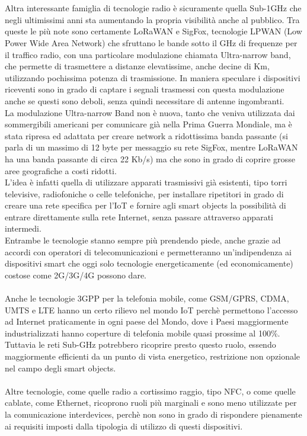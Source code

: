 \\\\Altra interessante famiglia di tecnologie radio è sicuramente quella Sub-1GHz che negli ultimissimi anni sta aumentando la propria visibilità anche al pubblico. Tra queste le più note sono certamente LoRaWAN e SigFox, tecnologie LPWAN (Low Power Wide Area Network) che sfruttano le bande sotto il GHz di frequenze per il traffico radio, con una particolare modulazione chiamata Ultra-narrow band, che permette di trasmettere a distanze elevatissime, anche decine di Km, utilizzando pochissima potenza di trasmissione. In maniera speculare i dispositivi riceventi sono in grado di captare i segnali trasmessi con questa modulazione anche se questi sono deboli, senza quindi necessitare di antenne ingombranti.
\\La modulazione Ultra-narrow Band non è nuova, tanto che veniva utilizzata dai sommergibili americani per comunicare già nella Prima Guerra Mondiale, ma è stata ripresa ed adattata per creare network a ridottissima banda passante (si parla di un massimo di 12 byte per messaggio su rete SigFox, mentre LoRaWAN ha una banda passante di circa 22 Kb/s) ma che sono in grado di coprire grosse aree geografiche a costi ridotti.
\\L'idea è infatti quella di utilizzare apparati trasmissivi già esistenti, tipo torri televisive, radiofoniche o celle telefoniche, per installare ripetitori in grado di creare una rete specifica per l'IoT e fornire agli smart objects la possibilità di entrare direttamente sulla rete Internet, senza passare attraverso apparati intermedi.
\\Entrambe le tecnologie stanno sempre più prendendo piede, anche grazie ad accordi con operatori di telecomunicazioni e permetteranno un'indipendenza ai dispositivi smart che oggi solo tecnologie energeticamente (ed economicamente) costose come 2G/3G/4G possono dare.
\\\\Anche le tecnologie 3GPP per la telefonia mobile, come GSM/GPRS, CDMA, UMTS e LTE hanno un certo rilievo nel mondo IoT perchè permettono l'accesso ad Internet praticamente in ogni paese del Mondo, dove i Paesi maggiormente industrializzati hanno coperture di telefonia mobile quasi prossime al 100\%. Tuttavia le reti Sub-GHz potrebbero ricoprire presto questo ruolo, essendo maggiormente efficienti da un punto di vista energetico, restrizione non opzionale nel campo degli smart objects.
\\\\Altre tecnologie, come quelle radio a cortissimo raggio, tipo NFC, o come quelle cablate, come Ethernet, ricoprono ruoli più marginali e sono meno utilizzate per la comunicazione interdevices, perchè non sono in grado di rispondere pienamente ai requisiti imposti dalla tipologia di utilizzo di questi dispositivi.

